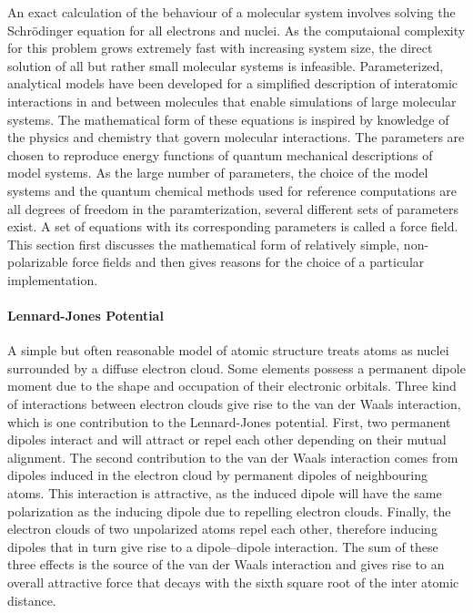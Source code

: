 \documentclass[english, a4paper, 12pt, titlepage, draft]{article}
\begin{document}
An exact calculation of the behaviour of a molecular system involves solving the Schr\"odinger equation for all electrons and nuclei.
As the computaional complexity for this problem grows extremely fast with increasing system size, the direct solution of all but rather small molecular systems is infeasible.
Parameterized, analytical models have been developed for a simplified description of interatomic interactions in and between molecules that enable simulations of large molecular systems.
The mathematical form of these equations is inspired by knowledge of the physics and chemistry that govern molecular interactions.
The parameters are chosen to reproduce energy functions of quantum mechanical descriptions of model systems.
As the large number of parameters, the choice of the model systems and the quantum chemical methods used for reference computations are all degrees of freedom in the paramterization, several different sets of parameters exist.
A set of equations with its corresponding parameters is called a force field.
This section first discusses the mathematical form of relatively simple, non-polarizable force fields and then gives reasons for the choice of a particular implementation.

\paragraph{Lennard-Jones Potential}
A simple but often reasonable model of atomic structure treats atoms as nuclei surrounded by a diffuse electron cloud.
Some elements possess a permanent dipole moment due to the shape and occupation of their electronic orbitals.
Three kind of interactions between electron clouds give rise to the van der Waals interaction, which is one contribution to the Lennard-Jones potential.
First, two permanent dipoles interact and will attract or repel each other depending on their mutual alignment.
The second contribution to the van der Waals interaction comes from dipoles induced in the electron cloud by permanent dipoles of neighbouring atoms.
This interaction is attractive, as the induced dipole will have the same polarization as the inducing dipole due to repelling electron clouds.
Finally, the electron clouds of two unpolarized atoms repel each other, therefore inducing dipoles that in turn give rise to a dipole--dipole interaction.
The sum of these three effects is the source of the van der Waals interaction and gives rise to an overall attractive force that decays with the sixth square root of the inter atomic distance.
\end{document}
